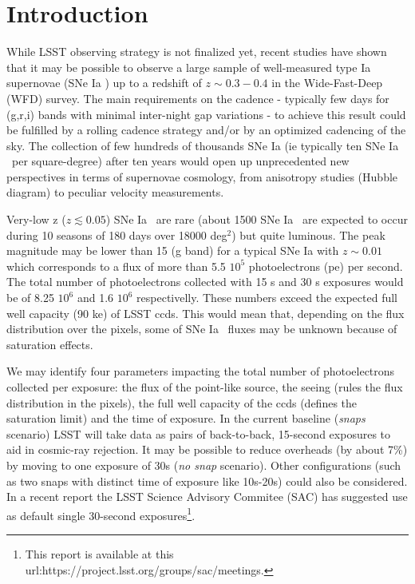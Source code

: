 \documentclass[\docopts]{\docclass}
\newcommand{\sne}{{SNe Ia }}
\newcommand{\pe}{{pe}}
\newcommand{\degsq}{deg$^2$}
\begin{document}
\section{Introduction}
\label{sec:intro}
While LSST observing strategy is not finalized yet, recent studies \cite{2018arXiv181200515L} have shown that it may be possible to observe a large sample of well-measured type Ia supernovae (\sne) up to a redshift of $z\sim 0.3-0.4$ in the Wide-Fast-Deep (WFD) survey. The main requirements on the cadence - typically few days for (g,r,i) bands with minimal inter-night gap variations - to achieve this result could be fulfilled by a rolling cadence strategy and/or by an optimized cadencing of the sky. The collection of few hundreds of thousands \sne (ie typically ten \sne~per square-degree) after ten years would open up unprecedented new perspectives in terms of supernovae cosmology, from anisotropy studies (Hubble diagram) to peculiar velocity measurements.\par
Very-low z ($z \lesssim 0.05$) \sne~are rare (about 1500 \sne~are expected to occur during 10 seasons of 180 days over 18000 \degsq) but quite luminous. The peak magnitude may be lower than 15 (g band) for a typical \sne with $z\sim 0.01$ which corresponds to a flux of more than 5.5 $10^5$ photoelectrons (\pe) per second. The total number of photoelectrons collected with 15 s and 30 s exposures would be of 8.25 $ 10^{6}$ and 1.6 $ 10^{6}$ respectivelly.  These numbers exceed the expected full well capacity (90 ke) of LSST ccds. This would mean that, depending on the flux distribution over the pixels, some of \sne~fluxes may be unknown because of saturation effects. \par
We may identify four parameters impacting the total number of photoelectrons collected per exposure: the flux of the point-like source, the seeing (rules the flux distribution in the pixels), the full well capacity of the ccds (defines the saturation limit) and the time of exposure. In the current baseline ({\it snaps} scenario) LSST will take data as pairs of back-to-back, 15-second exposures to aid in cosmic-ray rejection. It may be possible to reduce overheads (by about 7\%) by moving to one exposure of 30s ({\it no snap} scenario). Other configurations (such as two snaps with distinct time of exposure like 10s-20s) could also be considered. In a recent report the LSST Science Advisory Commitee (SAC) has suggested use as default single 30-second exposures\footnote{This report is available at this url:https://project.lsst.org/groups/sac/meetings.}.\par
\end{document}
